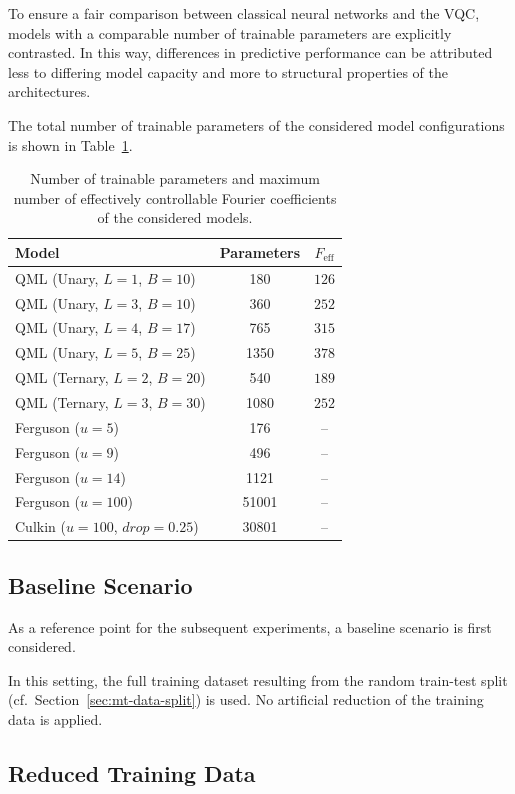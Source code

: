To ensure a fair comparison between
classical neural networks and the VQC,
models with a comparable number of trainable
parameters are explicitly contrasted.
In this way, differences in predictive performance
can be attributed less to differing model capacity
and more to structural properties of the architectures.

The total number of trainable parameters
of the considered model configurations
is shown in Table~\ref{tab:model-parameters}.

\begin{table}[htbp]
\centering
\begin{tabular}{l c c}
\hline
Model & Parameters & $F_{\text{eff}}$ \\
\hline
QML (Unary, $L=1$, $B=10$) & 180 & $126$ \\
QML (Unary, $L=3$, $B=10$) & 360 & $252$ \\
QML (Unary, $L=4$, $B=17$) & 765 & $315$ \\
QML (Unary, $L=5$, $B=25$) & 1350 & $378$ \\
QML (Ternary, $L=2$, $B=20$) & 540 & $189$ \\
QML (Ternary, $L=3$, $B=30$) & 1080 & $252$ \\
\hline
Ferguson ($u = 5$) & 176 & -- \\
Ferguson ($u = 9$) & 496 & -- \\
Ferguson ($u = 14$) & 1121 & -- \\
Ferguson ($u = 100$) & 51001 & -- \\
Culkin ($u = 100$, $drop=0.25$) & 30801 & -- \\
\hline
\end{tabular}
\caption{Number of trainable parameters and maximum number of effectively controllable Fourier coefficients of the considered models.}
\label{tab:model-parameters}
\end{table}

\subsection{Baseline Scenario}
\label{sec:mt-baseline}

As a reference point for the subsequent experiments,
a baseline scenario is first considered.

In this setting, the full training dataset resulting
from the random train-test split
(cf.~Section~\ref{sec:mt-data-split})
is used. No artificial reduction
of the training data is applied.

\subsection{Reduced Training Data}
\label{sec:mt-low-data}


